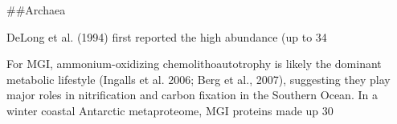 ##Archaea

DeLong et al. (1994) first reported the high abundance (up to 34%

For MGI, ammonium-oxidizing chemolithoautotrophy is likely the dominant metabolic lifestyle (Ingalls et al. 2006; Berg et al., 2007), suggesting they play major roles in nitrification and carbon fixation in the Southern Ocean. In a winter coastal Antarctic metaproteome, MGI proteins made up 30%


